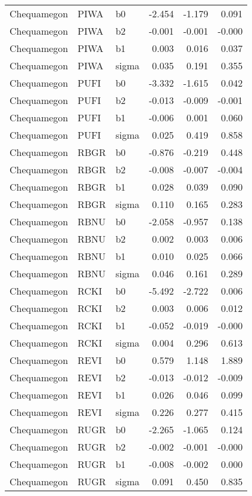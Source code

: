 \begin{table}[ht]
\begin{center}
\begin{tabular}{lllrrr}
  Chequamegon & PIWA & b0 & -2.454 & -1.179 & 0.091 \\ 
  Chequamegon & PIWA & b2 & -0.001 & -0.001 & -0.000 \\ 
  Chequamegon & PIWA & b1 & 0.003 & 0.016 & 0.037 \\ 
  Chequamegon & PIWA & sigma & 0.035 & 0.191 & 0.355 \\ 
  Chequamegon & PUFI & b0 & -3.332 & -1.615 & 0.042 \\ 
  Chequamegon & PUFI & b2 & -0.013 & -0.009 & -0.001 \\ 
  Chequamegon & PUFI & b1 & -0.006 & 0.001 & 0.060 \\ 
  Chequamegon & PUFI & sigma & 0.025 & 0.419 & 0.858 \\ 
  Chequamegon & RBGR & b0 & -0.876 & -0.219 & 0.448 \\ 
  Chequamegon & RBGR & b2 & -0.008 & -0.007 & -0.004 \\ 
  Chequamegon & RBGR & b1 & 0.028 & 0.039 & 0.090 \\ 
  Chequamegon & RBGR & sigma & 0.110 & 0.165 & 0.283 \\ 
  Chequamegon & RBNU & b0 & -2.058 & -0.957 & 0.138 \\ 
  Chequamegon & RBNU & b2 & 0.002 & 0.003 & 0.006 \\ 
  Chequamegon & RBNU & b1 & 0.010 & 0.025 & 0.066 \\ 
  Chequamegon & RBNU & sigma & 0.046 & 0.161 & 0.289 \\ 
  Chequamegon & RCKI & b0 & -5.492 & -2.722 & 0.006 \\ 
  Chequamegon & RCKI & b2 & 0.003 & 0.006 & 0.012 \\ 
  Chequamegon & RCKI & b1 & -0.052 & -0.019 & -0.000 \\ 
  Chequamegon & RCKI & sigma & 0.004 & 0.296 & 0.613 \\ 
  Chequamegon & REVI & b0 & 0.579 & 1.148 & 1.889 \\ 
  Chequamegon & REVI & b2 & -0.013 & -0.012 & -0.009 \\ 
  Chequamegon & REVI & b1 & 0.026 & 0.046 & 0.099 \\ 
  Chequamegon & REVI & sigma & 0.226 & 0.277 & 0.415 \\ 
  Chequamegon & RUGR & b0 & -2.265 & -1.065 & 0.124 \\ 
  Chequamegon & RUGR & b2 & -0.002 & -0.001 & -0.000 \\ 
  Chequamegon & RUGR & b1 & -0.008 & -0.002 & 0.000 \\ 
  Chequamegon & RUGR & sigma & 0.091 & 0.450 & 0.835 \\ 

\end{tabular}
\end{center}
\end{table}

